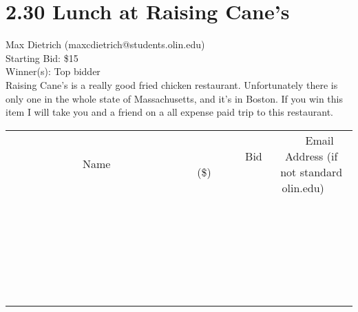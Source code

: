 \documentclass[11pt]{article}
\begin{document}
\section*{2.30 Lunch at Raising Cane's}
Max Dietrich (maxcdietrich@students.olin.edu) \\
Starting Bid: \$15 \\
Winner(s): 
Top bidder \\
Raising Cane's is a really good fried chicken restaurant.  Unfortunately there is only one in the whole state of Massachusetts, and it's in Boston.  If you win this item I will take you and a friend on a all expense paid trip to this restaurant. \\[6ex]
\begin{tabular}{c c c}
~~~~~~~~~~~~~Name~~~~~~~~~~~~~ & ~~~~~~~~~Bid (\$)~~~~~~~~~ & ~~~Email Address (if not standard olin.edu)~~~ \\
 & & \\
\hline
 & & \\
\hline
 & & \\
\hline
 & & \\
\hline
 & & \\
\hline
 & & \\
\hline
 & & \\
\hline
 & & \\
\hline
 & & \\
\hline
 & & \\
\hline
 & & \\
\hline
 & & \\
\hline
 & & \\
\hline
 & & \\
\hline
 & & \\
\hline
 & & \\
\hline
 & & \\
\hline
 & & \\
\hline
 & & \\
\hline
 & & \\
\hline
 & & \\
\hline
 & & \\
\hline
 & & \\
\hline
 & & \\
\hline
 & & \\
\hline
 & & \\
\hline
\end{tabular}
\clearpage
\end{document}
